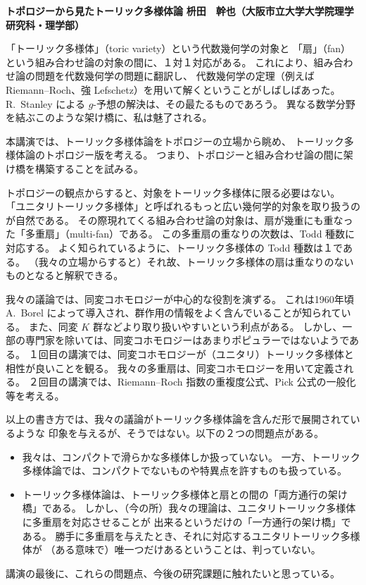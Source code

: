 \documentclass[uplatex,dvipdfmx]{jlreq}
\begin{document}
\noindent
{\large\bfseries トポロジーから見たトーリック多様体論}
\hfill
{\large\bfseries 枡田　幹也（大阪市立大学大学院理学研究科・理学部）}

\bigskip

「トーリック多様体」（toric variety）という代数幾何学の対象と
「扇」（fan）という組み合わせ論の対象の間に、１対１対応がある。
これにより、組み合わせ論の問題を代数幾何学の問題に翻訳し、
代数幾何学の定理（例えば Riemann--Roch、強 Lefschetz）を用いて解くということがしばしばあった。
R.~Stanley による $g$-予想の解決は、その最たるものであろう。
異なる数学分野を結ぶこのような架け橋に、私は魅了される。

本講演では、トーリック多様体論をトポロジーの立場から眺め、
トーリック多様体論のトポロジー版を考える。
つまり、トポロジーと組み合わせ論の間に架け橋を構築することを試みる。

トポロジーの観点からすると、対象をトーリック多様体に限る必要はない。
「ユニタリトーリック多様体」と呼ばれるもっと広い幾何学的対象を取り扱うのが自然である。
その際現れてくる組み合わせ論の対象は、扇が幾重にも重なった「多重扇」（multi-fan）である。
この多重扇の重なりの次数は、Todd 種数に対応する。
よく知られているように、トーリック多様体の Todd 種数は１である。
（我々の立場からすると）それ故、トーリック多様体の扇は重なりのないものとなると解釈できる。

我々の議論では、同変コホモロジーが中心的な役割を演ずる。
これは1960年頃 A.~Borel によって導入され、群作用の情報をよく含んでいることが知られている。
また、同変 $K$ 群などより取り扱いやすいという利点がある。
しかし、一部の専門家を除いては、同変コホモロジーはあまりポピュラーではないようである。
１回目の講演では、同変コホモロジーが（ユニタリ）トーリック多様体と相性が良いことを観る。
我々の多重扇は、同変コホモロジーを用いて定義される。
２回目の講演では、Riemann--Roch 指数の重複度公式、Pick 公式の一般化等を考える。

以上の書き方では、我々の議論がトーリック多様体論を含んだ形で展開されているような
印象を与えるが、そうではない。以下の２つの問題点がある。
\begin{itemize}
  \item 我々は、コンパクトで滑らかな多様体しか扱っていない。
        一方、トーリック多様体論では、コンパクトでないものや特異点を許すものも扱っている。
  \item トーリック多様体論は、トーリック多様体と扇との間の「両方通行の架け橋」である。
        しかし、（今の所）我々の理論は、ユニタリトーリック多様体に多重扇を対応させることが
        出来るというだけの「一方通行の架け橋」である。
        勝手に多重扇を与えたとき、それに対応するユニタリトーリック多様体が
        （ある意味で）唯一つだけあるということは、判っていない。
\end{itemize}
講演の最後に、これらの問題点、今後の研究課題に触れたいと思っている。
\end{document}
